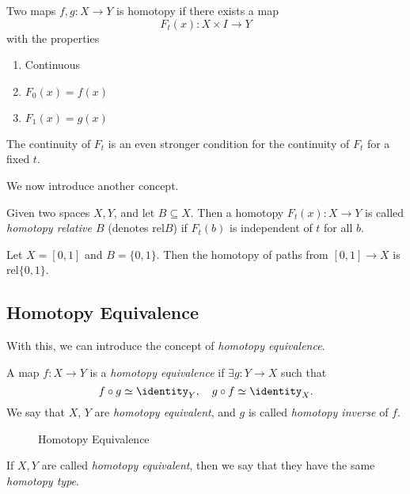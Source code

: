 \begin{prev}
	Two maps \(f, g\colon X\to Y\) is homotopy if there exists a map
	\[
		F_t(x)\colon X\times I\to Y
	\]
	with the properties
	\begin{enumerate}
		\item Continuous
		\item \(F_0(x) = f(x)\)
		\item \(F_1(x) = g(x)\)
	\end{enumerate}
	\begin{remark}
		The continuity of \(F_t\) is an even stronger condition for the continuity of \(F_t\) for a fixed \(t\).
	\end{remark}
\end{prev}

We now introduce another concept.
\begin{definition}
	Given two spaces \(X, Y\), and let \(B\subseteq X\). Then a homotopy \(F_t(x)\colon X\to Y\) is called
	\emph{homotopy relative \(B\)} (denotes \(\mathrm{rel} B\)) if \(F_t(b)\) is independent of \(t\) for all \(b\).
\end{definition}

\begin{eg}
	Let \(X = [0, 1]\) and \(B = \{0, 1\}\). Then the homotopy of paths from \([0, 1]\to X\) is \(\mathrm{rel} \{0, 1\}\).
	\begin{figure}[H]
		\centering
		\label{fig:eg:rel-homotopy}
	\end{figure}
\end{eg}

\subsection{Homotopy Equivalence}
With this, we can introduce the concept of \emph{homotopy equivalence}.
\begin{definition}
	A map \(f\colon X\to Y\) is a \emph{homotopy equivalence} if \(\exists g\colon Y\to X\) such that
	\[
		f\circ g \simeq \identity_Y, \quad g\circ f \simeq \identity_X.
	\]
	We say that \(X\), \(Y\) are \emph{homotopy equivalent}, and \(g\) is called \emph{homotopy inverse} of \(f\).
\end{definition}
\begin{figure}[H]
	\centering
	\caption{Homotopy Equivalence}
	\label{fig:def:homotopy-equivalence}
\end{figure}
If \(X, Y\) are called \emph{homotopy equivalent}, then we say that they have the same \emph{homotopy type}.

